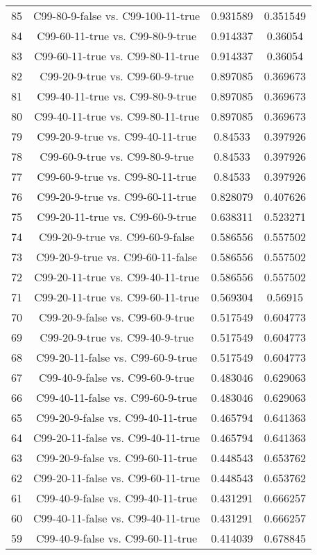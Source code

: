 \documentclass[a4paper,10pt]{article}
\begin{document}
\begin{landscape}
\begin{table}[!htp]
\begin{tabular}{cccc}
85&C99-80-9-false vs. C99-100-11-true&0.931589&0.351549\\
84&C99-60-11-true vs. C99-80-9-true&0.914337&0.36054\\
83&C99-60-11-true vs. C99-80-11-true&0.914337&0.36054\\
82&C99-20-9-true vs. C99-60-9-true&0.897085&0.369673\\
81&C99-40-11-true vs. C99-80-9-true&0.897085&0.369673\\
80&C99-40-11-true vs. C99-80-11-true&0.897085&0.369673\\
79&C99-20-9-true vs. C99-40-11-true&0.84533&0.397926\\
78&C99-60-9-true vs. C99-80-9-true&0.84533&0.397926\\
77&C99-60-9-true vs. C99-80-11-true&0.84533&0.397926\\
76&C99-20-9-true vs. C99-60-11-true&0.828079&0.407626\\
75&C99-20-11-true vs. C99-60-9-true&0.638311&0.523271\\
74&C99-20-9-true vs. C99-60-9-false&0.586556&0.557502\\
73&C99-20-9-true vs. C99-60-11-false&0.586556&0.557502\\
72&C99-20-11-true vs. C99-40-11-true&0.586556&0.557502\\
71&C99-20-11-true vs. C99-60-11-true&0.569304&0.56915\\
70&C99-20-9-false vs. C99-60-9-true&0.517549&0.604773\\
69&C99-20-9-true vs. C99-40-9-true&0.517549&0.604773\\
68&C99-20-11-false vs. C99-60-9-true&0.517549&0.604773\\
67&C99-40-9-false vs. C99-60-9-true&0.483046&0.629063\\
66&C99-40-11-false vs. C99-60-9-true&0.483046&0.629063\\
65&C99-20-9-false vs. C99-40-11-true&0.465794&0.641363\\
64&C99-20-11-false vs. C99-40-11-true&0.465794&0.641363\\
63&C99-20-9-false vs. C99-60-11-true&0.448543&0.653762\\
62&C99-20-11-false vs. C99-60-11-true&0.448543&0.653762\\
61&C99-40-9-false vs. C99-40-11-true&0.431291&0.666257\\
60&C99-40-11-false vs. C99-40-11-true&0.431291&0.666257\\
59&C99-40-9-false vs. C99-60-11-true&0.414039&0.678845\\

\end{tabular}
\end{table}
\end{landscape}
\end{document}
